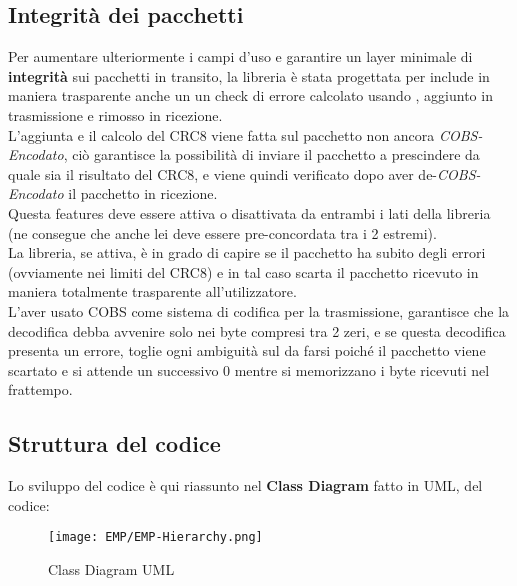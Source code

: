 \subsection{Integrità dei pacchetti}
Per aumentare ulteriormente i campi d’uso e garantire un layer minimale di \textbf{integrità} sui pacchetti in transito, la libreria è stata progettata per include in maniera trasparente anche un un check di errore calcolato usando \cite{CRC8}, aggiunto in trasmissione e rimosso in ricezione.\\
L'aggiunta e il calcolo del CRC8 viene fatta sul pacchetto non ancora \textit{COBS-Encodato}, ciò garantisce la possibilità di inviare il pacchetto a prescindere da quale sia il risultato del CRC8, e viene quindi verificato dopo aver de-\textit{COBS-Encodato} il pacchetto in ricezione.\\
Questa features deve essere attiva o disattivata da entrambi i lati della libreria (ne consegue che anche lei deve essere pre-concordata tra i 2 estremi).\\
La libreria, se attiva, è in grado di capire se il pacchetto ha subito degli errori (ovviamente nei limiti del CRC8) e in tal caso scarta il pacchetto ricevuto in maniera totalmente trasparente all'utilizzatore.\\
L’aver usato COBS come sistema di codifica per la trasmissione, garantisce che la decodifica debba avvenire solo nei byte compresi tra 2 zeri, e se questa decodifica presenta un errore, toglie ogni ambiguità sul da farsi poiché il pacchetto viene scartato e si attende un successivo 0 mentre si memorizzano i byte ricevuti nel frattempo.

\newpage
\subsection{Struttura del codice}
Lo sviluppo del codice è qui riassunto nel \textbf{Class Diagram} fatto in UML, del codice:\\
\begin{figure}[h]
	\centering
	\caption[Class Diagram UML di EMP]{Class Diagram UML}
	\texttt{[image: EMP/EMP-Hierarchy.png]}
\end{figure}

